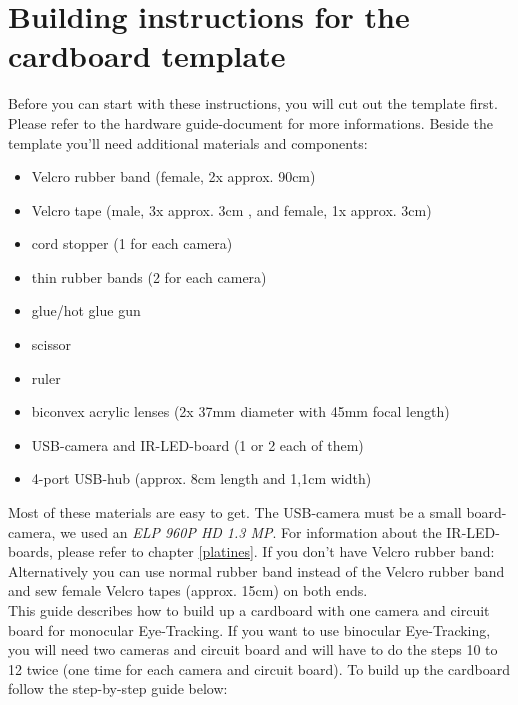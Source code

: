 \documentclass[../../Cardboard_Assembling]{subfiles}
\begin{document}
\chapter{Building instructions for the cardboard template}
Before you can start with these instructions, you will cut out the template first. Please refer to the hardware guide-document for more informations. Beside the template you'll need additional materials and components: 
\begin{itemize}
	\item Velcro rubber band (female, 2x approx. 90cm) 
	\item Velcro tape (male, 3x approx. 3cm , and female, 1x approx. 3cm)
	\item cord stopper (1 for each camera)
	\item thin rubber bands (2 for each camera)
	\item glue/hot glue gun
	\item scissor
	\item ruler
	\item biconvex acrylic lenses (2x 37mm diameter with 45mm focal length)
	\item USB-camera and IR-LED-board (1 or 2 each of them)
	\item 4-port USB-hub (approx. 8cm length and 1,1cm width)
\end{itemize}

Most of these materials are easy to get. The USB-camera must be a small board-camera, we used an \textit{ELP 960P HD 1.3 MP}. For information about the IR-LED-boards, please refer to chapter \ref{platines}. If you don't have Velcro rubber band: Alternatively you can use normal rubber band instead of the Velcro rubber band and sew female Velcro tapes (approx. 15cm) on both ends.\\
This guide describes how to build up a cardboard with one camera and circuit board for monocular Eye-Tracking. If you want to use binocular Eye-Tracking, you will need two cameras and circuit board and will have to do the steps 10 to 12 twice (one time for each camera and circuit board). To build up the cardboard follow the step-by-step guide below:
\end{document}
